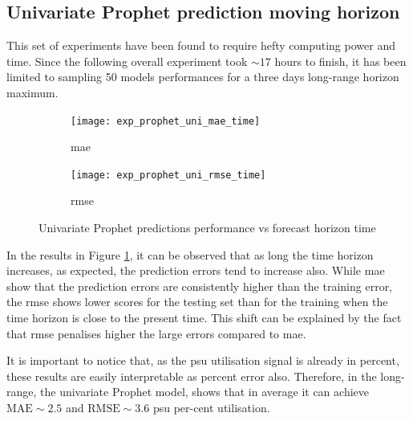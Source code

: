 \subsection{Univariate Prophet prediction moving horizon}
\label{subsec:Results-Experiments-UnivariateProphet}

This set of experiments have been found to require hefty computing power and time. Since the following overall experiment took $\sim17$ hours to finish, it has been limited to sampling 50 models performances for a three days long-range horizon maximum.



\begin{figure}[H]
	\centering
	\begin{subfigure}{0.49\linewidth}
		\texttt{[image: exp\_prophet\_uni\_mae\_time]}
		\caption{\ac{mae}}
	\end{subfigure}
	\hfill
	\begin{subfigure}{0.49\linewidth}
		\texttt{[image: exp\_prophet\_uni\_rmse\_time]}
		\caption{\ac{rmse}}
	\end{subfigure}
	\caption{Univariate Prophet predictions performance vs forecast horizon time}
	\label{fig:uni_prophet_performances}
\end{figure}

In the results in Figure \ref{fig:uni_prophet_performances}, it can be observed that as long the time horizon increases, as expected, the prediction errors tend to increase also. While \ac{mae} show that the prediction errors are consistently higher than the training error, the \ac{rmse} shows lower scores for the testing set than for the training when the time horizon is close to the present time. This shift can be explained by the fact that \ac{rmse} penalises higher the large errors compared to \ac{mae}. 

It is important to notice that, as the \ac{psu} utilisation signal is already in percent, these results are easily interpretable as percent error also. Therefore, in the long-range, the univariate Prophet model, shows that in average it can achieve $\text{MAE}\sim2.5$ and $\text{RMSE} \sim 3.6$ \ac{psu} per-cent utilisation.

